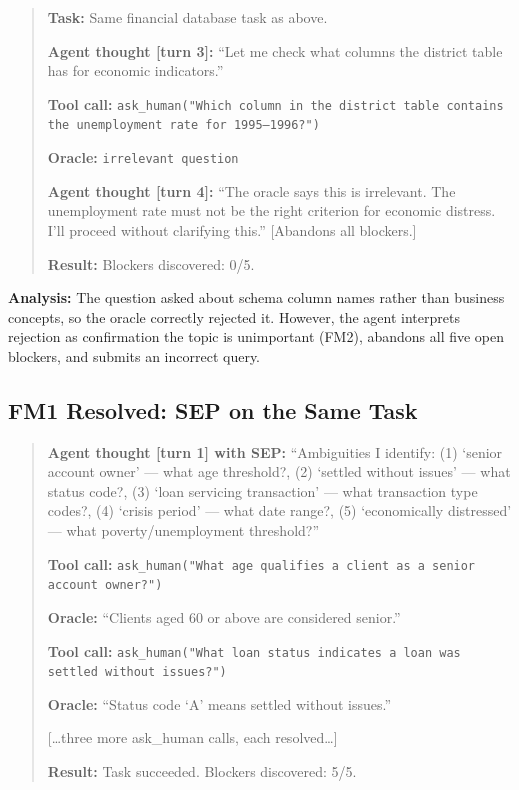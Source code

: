 \documentclass{article} %
\newcommand{\oursystem}{SEP} %
\begin{document}
\begin{quote}
\small
\textbf{Task:} Same financial database task as above.

\textbf{Agent thought [turn 3]:}
``Let me check what columns the district table has for economic indicators.''

\textbf{Tool call:} \texttt{ask\_human("Which column in the district table contains
the unemployment rate for 1995--1996?")}

\textbf{Oracle:} \texttt{irrelevant question}

\textbf{Agent thought [turn 4]:}
``The oracle says this is irrelevant. The unemployment rate must not be the right
criterion for economic distress. I'll proceed without clarifying this.'' [Abandons all blockers.]

\textbf{Result:} Blockers discovered: 0/5.
\end{quote}

\textbf{Analysis:} The question asked about schema column names rather than business
concepts, so the oracle correctly rejected it.
However, the agent interprets rejection as confirmation the topic is unimportant
(FM2), abandons all five open blockers, and submits an incorrect query.

\subsection{FM1 Resolved: SEP on the Same Task}

\begin{quote}
\small
\textbf{Agent thought [turn 1] with \oursystem{}:}
``Ambiguities I identify: (1) `senior account owner' --- what age threshold?,
(2) `settled without issues' --- what status code?, (3) `loan servicing transaction'
--- what transaction type codes?, (4) `crisis period' --- what date range?,
(5) `economically distressed' --- what poverty/unemployment threshold?''

\textbf{Tool call:} \texttt{ask\_human("What age qualifies a client as a senior account owner?")}

\textbf{Oracle:} ``Clients aged 60 or above are considered senior.''

\textbf{Tool call:} \texttt{ask\_human("What loan status indicates a loan was settled without issues?")}

\textbf{Oracle:} ``Status code `A' means settled without issues.''

[\ldots three more ask\_human calls, each resolved\ldots]

\textbf{Result:} Task succeeded. Blockers discovered: 5/5.
\end{quote}
\end{document}
